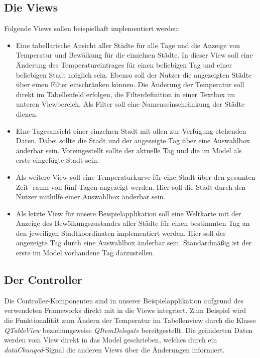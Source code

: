 \documentclass[11pt,a4paper]{scrreprt}
\begin{document}
\subsection{Die Views}
Folgende Views sollen beispielhaft implementiert werden:
\begin{itemize}
  \item Eine tabellarische Ansicht aller St\"adte f\"ur alle Tage und die Anzeige von
  Temperatur und Bew\"olkung f\"ur die einzelnen St\"adte. In dieser View soll eine
  \"Anderung des Temperatureintrages f\"ur einen beliebigen Tag und einer beliebigen
  Stadt m\"oglich sein. Ebenso soll der Nutzer die angezeigten St\"adte \"uber einen Filter
  einschr\"anken k\"onnen. Die \"Anderung der Temperatur soll direkt im Tabellenfeld erfolgen,
  die Filterdefinition in einer Textbox im unteren Viewbereich. Als Filter soll eine
  Namenseinschr\"ankung der St\"adte dienen.

  \item Eine Tagesansicht einer einzelnen Stadt mit allen zur Verf\"ugung stehenden
  Daten. Dabei sollte die Stadt und der angezeigte Tag \"uber eine Auswahlbox
  \"anderbar sein. Voreingestellt sollte der aktuelle Tag und die im Model als erste
  eingef\"ugte Stadt sein.

  \item Als weitere View soll eine Temperaturkurve f\"ur eine Stadt \"uber den gesamten Zeit-
  raum von f\"unf Tagen angezeigt werden. Hier soll die Stadt durch den Nutzer mithilfe einer
  Auswahlbox \"anderbar sein.

  \item Als letzte View f\"ur unsere Beispielapplikation soll eine Weltkarte mit der Anzeige des
  Bew\"olkungszustandes aller St\"adte f\"ur einen bestimmten Tag an den jeweiligen
  Stadtkoordinaten implementiert werden. Hier soll der angezeigte Tag durch eine Auswahlbox
  \"anderbar sein. Standardm\"a{\ss}ig ist der erste im Model vorhandene Tag darzustellen.
\end{itemize}

\subsection{Der Controller}
Die Controller-Komponenten sind in unserer Beispielapplikation aufgrund des verwendeten Frameworks
direkt mit in die Views integriert. Zum Beispiel wird die Funktionalit\"at zum \"Andern der Temperatur
im Tabellenview durch die Klasse {\itshape QTableView} beziehungsweise {\itshape QItemDelegate} bereitgestellt.
Die ge\"anderten Daten werden vom View direkt in das Model geschrieben, welches durch ein {\itshape dataChanged}-Signal
die anderen Views \"uber die \"Anderungen informiert.
\end{document}
